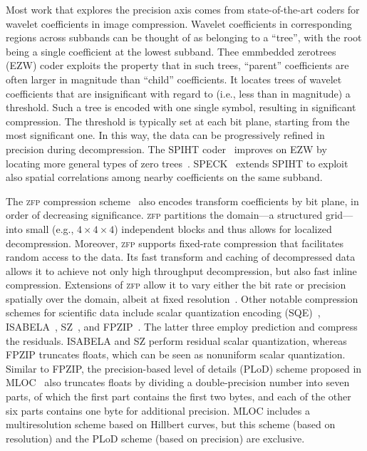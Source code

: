 Most work that explores the precision axis comes from state-of-the-art coders for wavelet
coefficients in image compression. Wavelet coefficients in corresponding regions across subbands can
be thought of as belonging to a ``tree'', with the root being a single coefficient at the lowest
subband. Thee emmbedded zerotrees (EZW) coder exploits the property that in such trees, ``parent''
coefficients are often larger in magnitude than ``child'' coefficients. It locates trees of wavelet
coefficients that are insignificant with regard to (i.e., less than in magnitude) a threshold. Such
a tree is encoded with one single symbol, resulting in significant compression. The threshold is
typically set at each bit plane, starting from the most significant one. In this way, the data can
be progressively refined in precision during decompression. The SPIHT coder~\cite{spiht1996}
improves on EZW by locating more general types of zero trees~\cite{quantifying-coding-performance}.
SPECK~\cite{speck2004} extends SPIHT to exploit also spatial correlations among nearby coefficients
on the same subband.

\newcommand{\zfp}{\textsc{zfp}\xspace}
The \zfp compression scheme~\cite{zfp2014} also encodes transform coefficients by bit plane, in
order of decreasing significance. \zfp partitions the domain---a structured grid---into small (e.g.,
$4 \times 4 \times 4$) independent blocks and thus allows for localized decompression. Moreover,
\zfp supports fixed-rate compression that facilitates random access to the data. Its fast transform
and caching of decompressed data allows it to achieve not only high throughput decompression, but
also fast inline compression. Extensions of \zfp allow it to vary either the bit rate or precision
spatially over the domain, albeit at fixed resolution~\cite{zfp-arc}. Other notable compression
schemes for scientific data include scalar quantization encoding (SQE)~\cite{sqe},
ISABELA~\cite{isabela}, SZ~\cite{sz}, and FPZIP~\cite{fpzip}. The latter three employ prediction and
compress the residuals. ISABELA and SZ perform residual scalar quantization, whereas FPZIP truncates
floats, which can be seen as nonuniform scalar quantization. Similar to FPZIP, the precision-based
level of details (PLoD) scheme proposed in MLOC~\cite{mloc} also truncates floats by dividing a
double-precision number into seven parts, of which the first part contains the first two bytes, and
each of the other six parts contains one byte for additional precision. MLOC includes a
multiresolution scheme based on Hillbert curves, but this scheme (based on resolution) and the PLoD
scheme (based on precision) are exclusive.

